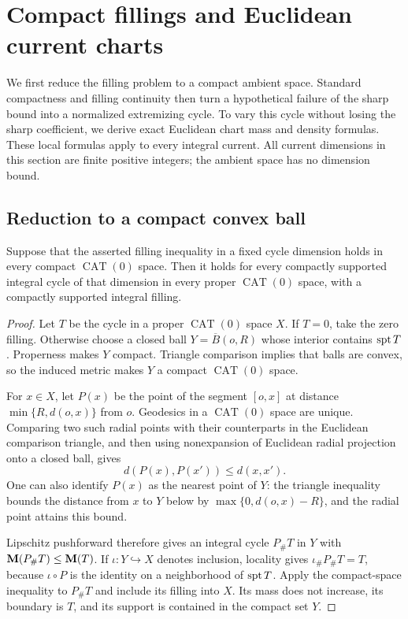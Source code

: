 \section{Compact fillings and Euclidean current charts}
\label{sec:currents}

We first reduce the filling problem to a compact ambient space. Standard
compactness and filling continuity then turn a hypothetical failure of the
sharp bound into a normalized extremizing cycle. To vary this cycle
without losing the sharp coefficient, we derive exact Euclidean chart
mass and density formulas. These local formulas apply to every integral
current. All current dimensions in this section are finite positive
integers; the ambient space has no dimension bound.

\subsection{Reduction to a compact convex ball}

\begin{lemma}
\label{lem:compact-reduction}
Suppose that the asserted filling inequality in a fixed cycle dimension
holds in every compact \(\operatorname{CAT}(0)\) space. Then it holds for
every compactly supported integral cycle of that dimension in every proper
\(\operatorname{CAT}(0)\) space, with a compactly supported integral filling.
\end{lemma}

\begin{proof}
Let \(T\) be the cycle in a proper \(\operatorname{CAT}(0)\) space \(X\).
If \(T=0\), take the zero filling. Otherwise choose a closed ball
\(Y=\overline B(o,R)\) whose interior contains \(\operatorname{spt} T\).
Properness makes \(Y\) compact. Triangle comparison implies that balls
are convex, so the induced metric makes \(Y\) a compact
\(\operatorname{CAT}(0)\) space.

For \(x\in X\), let \(P(x)\) be the point of the segment \([o,x]\)
at distance \(\min\{R,d(o,x)\}\) from \(o\).
Geodesics in a \(\operatorname{CAT}(0)\) space are unique. Comparing two
such radial points with their counterparts in the Euclidean comparison
triangle, and then using nonexpansion of Euclidean radial projection onto
a closed ball, gives
\[
 d(P(x),P(x'))\le d(x,x').
\]
One can also identify \(P(x)\) as the nearest point of \(Y\): the triangle
inequality bounds the distance from \(x\) to \(Y\) below by
\(\max\{0,d(o,x)-R\}\), and the radial point attains this bound.

Lipschitz pushforward therefore gives an integral cycle \(P_\#T\) in
\(Y\) with \(\mathbf M(P_\#T)\le\mathbf M(T)\). If
\(\iota:Y\hookrightarrow X\) denotes inclusion, locality gives
\(\iota_\#P_\#T=T\), because \(\iota\circ P\) is the identity on a
neighborhood of \(\operatorname{spt} T\). Apply the compact-space inequality to
\(P_\#T\) and include its filling into \(X\). Its mass does not increase,
its boundary is \(T\), and its support is contained in the compact set
\(Y\).
\end{proof}

